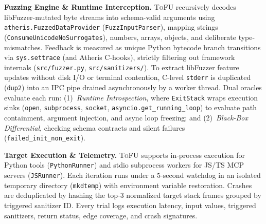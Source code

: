 \noindent\textbf{Fuzzing Engine \& Runtime Interception.}
\textsc{ToFU} recursively decodes libFuzzer-mutated byte streams into schema-valid arguments using \texttt{atheris.FuzzedDataProvider} (\texttt{FuzzInputParser}), mapping strings (\texttt{ConsumeUnicodeNoSurrogates}), numbers, arrays, objects, and deliberate type-mismatches. Feedback is measured as unique Python bytecode branch transitions via \texttt{sys.settrace} (and Atheris C-hooks), strictly filtering out framework internals (\texttt{src/fuzzer.py}, \texttt{src/sanitizers/}). To extract libFuzzer feature updates without disk I/O or terminal contention, C-level \texttt{stderr} is duplicated (\texttt{dup2}) into an IPC pipe drained asynchronously by a worker thread. Dual oracles evaluate each run: (1)~\emph{Runtime Introspection}, where \texttt{ExitStack} wraps execution sinks (\texttt{open}, \texttt{subprocess}, \texttt{socket}, \texttt{asyncio.get\_running\_loop}) to evaluate path containment, argument injection, and async loop freezing; and (2)~\emph{Black-Box Differential}, checking schema contracts and silent failures (\texttt{failed\_init\_non\_exit}).

\noindent\textbf{Target Execution \& Telemetry.}
\textsc{ToFU} supports in-process execution for Python tools (\texttt{PythonRunner}) and stdio subprocess workers for JS/TS MCP servers (\texttt{JSRunner}). Each iteration runs under a 5-second watchdog in an isolated temporary directory (\texttt{mkdtemp}) with environment variable restoration. Crashes are deduplicated by hashing the top-3 normalized target stack frames grouped by triggered sanitizer ID. Every trial logs execution latency, input values, triggered sanitizers, return status, edge coverage, and crash signatures.